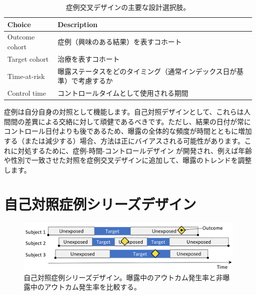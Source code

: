 \documentclass[
  11pt]{book}
\theoremstyle{definition}
\theoremstyle{definition}
\theoremstyle{definition}
\theoremstyle{definition}
\theoremstyle{remark}
\begin{document}
\begin{table}
\centering
\caption{\label{tab:ccrChoices}症例交叉デザインの主要な設計選択肢。}
\centering
\begin{tabular}[t]{l>{\raggedright\arraybackslash}p{9cm}}
\toprule
Choice & Description\\
\midrule
Outcome cohort & 症例（興味のある結果）を表すコホート\\
Target cohort & 治療を表すコホート\\
Time-at-risk & 曝露ステータスをどのタイミング（通常インデックス日が基準）で考慮するか\\
Control time & コントロールタイムとして使用される期間\\
\bottomrule
\end{tabular}
\end{table}

症例は自分自身の対照として機能します。自己対照デザインとして、これらは人間間の差異による交絡に対して頑健であるべきです。ただし、結果の日付が常にコントロール日付よりも後であるため、曝露の全体的な頻度が時間とともに増加する（または減少する）場合、方法は正にバイアスされる可能性があります。これに対処するために、症例-時間-コントロールデザイン \citep[ ]{suissa_1995} が開発され、例えば年齢や性別で一致させた対照を症例交叉デザインに追加して、曝露のトレンドを調整します。

\section{自己対照症例シリーズデザイン}\label{ux81eaux5df1ux5bfeux7167ux75c7ux4f8bux30b7ux30eaux30fcux30baux30c7ux30b6ux30a4ux30f3}


\begin{figure}[h]

{\centering \includegraphics[width=0.9\linewidth]{images/PopulationLevelEstimation/selfControlledCaseSeries} 

}

\caption{自己対照症例シリーズデザイン。曝露中のアウトカム発生率と非曝露中のアウトカム発生率を比較する。}\label{fig:selfControlledCaseSeries}
\end{figure}
\end{document}
